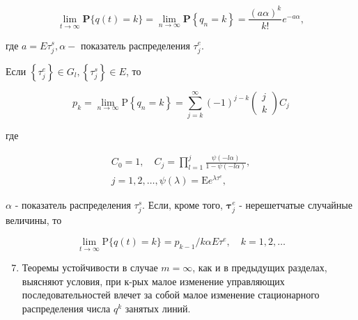 \documentclass[10pt]{article}
\begin{document}
\[

\lim _{t \rightarrow \infty} \mathbf{P}\{q(t)=k\}=\lim _{n \rightarrow \infty} \mathbf{P}\left\{q_{n}=k\right\}=\frac{(a \alpha)^{k}}{k !} e^{-a \alpha},

\]



где $a=E \tau_{j}^{s}, \alpha-$ показатель распределения $\tau_{j}^{e}$.



Если $\left\{\tau_{j}^{e}\right\} \in G_{l},\left\{\tau_{j}^{s}\right\} \in E$, то



\[

p_{k}=\lim _{n \rightarrow \infty} \mathrm{P}\left\{q_{n}=k\right\}=\sum_{j=k}^{\infty}(-1)^{j-k}\left(\begin{array}{l}

j \\

k

\end{array}\right) C_{j}

\]



где



\[

\begin{gathered}

C_{0}=1, \quad C_{j}=\prod_{l=1}^{j} \frac{\psi(-l \alpha)}{1-\psi(-l \alpha)}, \\

j=1,2, \ldots, \psi(\lambda)=\mathrm{E} e^{\lambda \tau^{e}},

\end{gathered}

\]



$\alpha$ - показатель распределения $\tau_{j}^{s}$. Если, кроме того, $\boldsymbol{\tau}_{j}^{e}$ - нерешетчатые случайные величины, то



\[

\lim _{t \rightarrow \infty} \mathrm{P}\{q(t)=k\}=p_{k-1} / k \alpha E \tau^{e}, \quad k=1,2, \ldots

\]



\begin{enumerate}

  \setcounter{enumi}{6}

  \item Теоремы устойчивости в случае $m=\infty$, как и в предыдущих разделах, выясняют условия, при к-рых малое изменение управляющих последовательностей влечет за собой малое изменение стационарного распределения числа $q^{k}$ занятых линий.

\end{enumerate}
\end{document}
